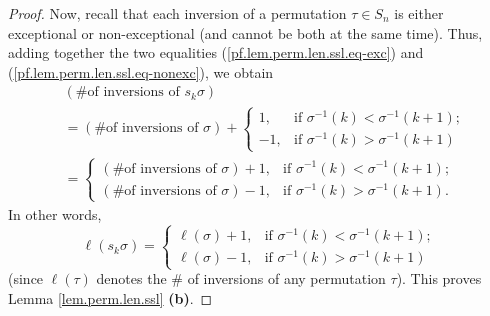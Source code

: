 \begin{proof}
Now, recall that each inversion of a permutation $\tau\in S_{n}$ is either
exceptional or non-exceptional (and cannot be both at the same time). Thus,
adding together the two equalities (\ref{pf.lem.perm.len.ssl.eq-exc}) and
(\ref{pf.lem.perm.len.ssl.eq-nonexc}), we obtain%
\begin{align*}
&  \left(  \text{\# of inversions of }s_{k}\sigma\right) \\
&  =\left(  \text{\# of inversions of }\sigma\right)  +%
\begin{cases}
1, & \text{if }\sigma^{-1}\left(  k\right)  <\sigma^{-1}\left(  k+1\right)
;\\
-1, & \text{if }\sigma^{-1}\left(  k\right)  >\sigma^{-1}\left(  k+1\right)
\end{cases}
\\
&  =%
\begin{cases}
\left(  \text{\# of inversions of }\sigma\right)  +1, & \text{if }\sigma
^{-1}\left(  k\right)  <\sigma^{-1}\left(  k+1\right)  ;\\
\left(  \text{\# of inversions of }\sigma\right)  -1, & \text{if }\sigma
^{-1}\left(  k\right)  >\sigma^{-1}\left(  k+1\right)  .
\end{cases}
\end{align*}
In other words,%
\[
\ell\left(  s_{k}\sigma\right)  =%
\begin{cases}
\ell\left(  \sigma\right)  +1, & \text{if }\sigma^{-1}\left(  k\right)
<\sigma^{-1}\left(  k+1\right)  ;\\
\ell\left(  \sigma\right)  -1, & \text{if }\sigma^{-1}\left(  k\right)
>\sigma^{-1}\left(  k+1\right)
\end{cases}
\]
(since $\ell\left(  \tau\right)  $ denotes the \# of inversions of any
permutation $\tau$). This proves Lemma \ref{lem.perm.len.ssl} \textbf{(b)}.
\medskip


\end{proof}

